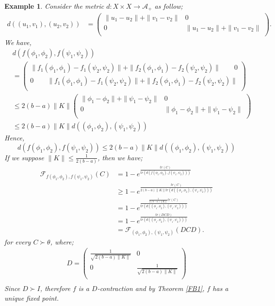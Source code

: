 \documentclass{amsart}%
\theoremstyle{plain}
\newtheorem{example}{Example}
\numberwithin{equation}{section}
\begin{document}
\begin{example}
	Consider the metric $d: X\times X \to \mathcal{A}_+$ as follow;
	\begin{align*}
		d((u_1, v_1),(u_2, v_2))&=\left(
		\begin{array}{cc}
			\|u_1-u_2\|+\|v_1-v_2\| & 0  \\
			0 & \|u_1-u_2\|+\|v_1-v_2\|  \\
		\end{array}
		\right).
	\end{align*}
	We have,
	\begin{align*}
		&d\left(f(\phi_1, \phi_2),f(\psi_1,\psi_2) \right)\\
		&=\left(
		\begin{array}{cc}
			\|f_1(\phi_1,\phi_1)-f_1(\psi_2,\psi_2)\|+\|f_2(\phi_1,\phi_1)-f_2(\psi_2,\psi_2)\| \qquad 0  \\
			0 \qquad \|f_1(\phi_1,\phi_1)-f_1(\psi_2,\psi_2)\|+\|f_2(\phi_1,\phi_1)-f_2(\psi_2,\psi_2)\|\\
		\end{array}
		\right)	\\
		&\leq 2(b-a)\|K\|\left(
		\begin{array}{cc}
			\|\phi_1-\phi_2\|+\|\psi_1-\psi_2\| & 0  \\
			0 & \|\phi_1-\phi_2\|+\|\psi_1-\psi_2\|  \\
		\end{array}
		\right)\\ 
		&\leq  2(b-a)\|K\|d\left((\phi_1, \phi_2),(\psi_1,\psi_2) \right) 
	\end{align*}
	Hence,
	$$d\left(f(\phi_1, \phi_2),f(\psi_1,\psi_2) \right)\leq  2(b-a)\|K\|d\left((\phi_1, \phi_2),(\psi_1,\psi_2) \right)$$
	If we suppose $\|K\|\leq \frac{1}{2(b-a)}$, then we have;
	\begin{align*}
		\mathcal{F}_{f(\phi_1, \phi_2),f(\psi_1,\psi_2)}(C)&=1-e^{\frac{tr(C)}{tr \left(d(f(\phi_1, \phi_2),f(\psi_1,\psi_2))\right)}}\\
		&\geq 1-e^{\frac{tr(C)}{2(b-a)\|K\| tr\left(d((\phi_1, \phi_2),(\psi_1,\psi_2))\right)}}\\
		&=1-e^{\frac{\frac{1}{2(b-a)\|K\|}tr(C)}{tr\left(d((\phi_1, \phi_2),(\psi_1,\psi_2))\right)}}\\
		&=1-e^{\frac{tr(DCD)}{tr\left(d((\phi_1, \phi_2),(\psi_1,\psi_2))\right)}}\\
		&=\mathcal{F}_{(\phi_1, \phi_2),(\psi_1,\psi_2)}(DCD).
	\end{align*}
	for every $C\succ \theta$, where;
	\begin{align*}
		D=\left(
		\begin{array}{cc}
			\frac{1}{\sqrt{2(b-a)\|K\|}} & 0  \\
			0 & \frac{1}{\sqrt{2(b-a)\|K\|}}\\
		\end{array}
		\right)	\\
	\end{align*}
	Since $D\succ I$, therefore $f$ is a $D$-contraction and by Theorem \ref{FB1}, $f$ has a unique fixed point.
\end{example}
\end{document}
